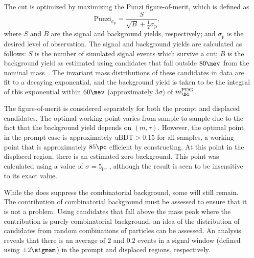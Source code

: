 
%

The \uBDT cut is optimized  by maximizing
the Punzi figure-of-merit, which is defined as
\begin{equation}
  \mathrm{Punzi}_{\sigma_\mathrm{p}} = \frac{S}{\sqrt{B} + \tfrac12\sigma_\mathrm{p}},
  \label{eq:db:punzi}
\end{equation}
where $S$ and $B$ are the signal and background yields, respectively; and $\sigma_\mathrm{p}$ is the desired
level of observation.
The signal and background yields are calculated as follows:
$S$ is the number of simulated signal events which survive a \uBDT cut;
$B$ is the background yield as estimated using \btokstrdb candidates
that fall outside $80\mev$ from the nominal \Bd mass~\cite{PDG2014}.
The invariant mass distributions of these candidates in data are fit to a decaying exponential,
and the background yield is taken to be the integral of this exponential within $60\mev$
(approximately $3\sigma$) of $m^\mathrm{PDG}_{\Bd}$.

The figure-of-merit is considered separately for both the prompt and displaced candidates.
The optimal working point varies from sample to sample due to the fact that the background yield
depends on $(m,\tau)$.
However, the optimal point in the prompt case is approximately $\mathrm{uBDT}>0.15$ for all samples, a
working point that
is approximately $85\pc$ efficient by constructing.
At this point in the displaced region, there is an estimated zero background.
This point was calculated using a value of $\sigma=5_\mathrm{p}$, , although the
result is seen to be insensitive to its exact value.

While the \uBDT does suppress the combinatorial background, some will still remain.
The contribution of combinatorial background must be assessed to ensure that it is not a problem.
Using \Bd candidates that fall above the \Bd mass peak where the contribution is purely
combinatorial background, an idea of the distribution of \db candidates from random combinations of
particles can be assessed.
An analysis reveals that there is an average of \approx$2$ and \approx$0.2$ events in a signal
window (defined using $\pm2\sigmam$) in the prompt and displaced regions, respectively.


